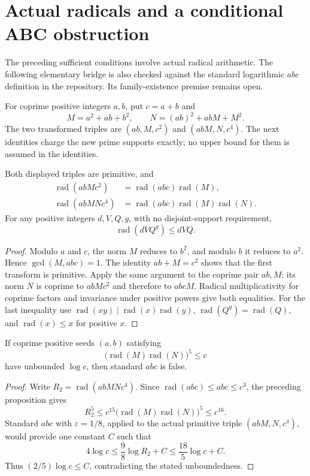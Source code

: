 \section{Actual radicals and a conditional ABC obstruction}
\label{sec:rt-integer-radical-gate}
The preceding sufficient conditions involve actual radical arithmetic. The
following elementary bridge is also checked against the standard logarithmic
$abc$ definition in the repository. Its family-existence premise remains open.

For coprime positive integers $a,b$, put $c=a+b$ and
\[
 M=a^2+ab+b^2,\qquad N=(ab)^2+abM+M^2.
\]
The two transformed triples are $(ab,M,c^2)$ and $(abM,N,c^4)$.
The next identities charge the new prime supports exactly; no upper bound
for them is assumed in the identities.

\begin{proposition}
\label{prop:rt-two-step-radical}
Both displayed triples are primitive, and
\begin{align*}
 \operatorname{rad}(abMc^2)
   &=\operatorname{rad}(abc)\operatorname{rad}(M),\\
 \operatorname{rad}(abMNc^4)
   &=\operatorname{rad}(abc)\operatorname{rad}(M)\operatorname{rad}(N).
\end{align*}
For any positive integers $d,V,Q,g$, with no disjoint-support requirement,
\[
 \operatorname{rad}(dVQ^g)\le dVQ.
\]
\end{proposition}
\begin{proof}
Modulo $a$ and $c$, the norm $M$ reduces to $b^2$, and modulo $b$ it
reduces to $a^2$. Hence $\gcd(M,abc)=1$. The identity $ab+M=c^2$
shows that the first transform is primitive. Apply the same argument to
the coprime pair $ab,M$; its norm $N$ is coprime to $abMc^2$ and therefore
to $abcM$. Radical multiplicativity for coprime factors and invariance
under positive powers give both equalities. For the last inequality use
$\operatorname{rad}(xy)\mid\operatorname{rad}(x)\operatorname{rad}(y)$,
$\operatorname{rad}(Q^g)=\operatorname{rad}(Q)$, and
$\operatorname{rad}(x)\le x$ for positive $x$.
\end{proof}

\begin{theorem}
\label{thm:rt-integer-gate}
If coprime positive seeds $(a,b)$ satisfying
\begin{equation}
 \bigl(\operatorname{rad}(M)\operatorname{rad}(N)\bigr)^5\le c
 \label{eq:rt-integer-gate}
\end{equation}
have unbounded $\log c$, then standard $abc$ is false.
\end{theorem}
\begin{proof}
Write $R_2=\operatorname{rad}(abMNc^4)$. Since
$\operatorname{rad}(abc)\le abc\le c^3$, the preceding proposition gives
\[
 R_2^5\le c^{15}
   \bigl(\operatorname{rad}(M)\operatorname{rad}(N)\bigr)^5
 \le c^{16}.
\]
Standard $abc$ with $\varepsilon=1/8$, applied to the actual primitive
triple $(abM,N,c^4)$, would provide one constant $C$ such that
\[
 4\log c\le \frac98\log R_2+C
 \le\frac{18}{5}\log c+C.
\]
Thus $(2/5)\log c\le C$, contradicting the stated unboundedness.
\end{proof}

